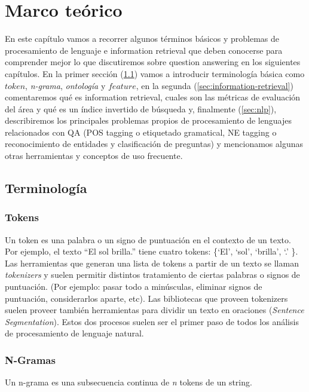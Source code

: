 
\chapter{Marco teórico}
\label{chap:teorico}

En este capítulo vamos a recorrer algunos términos básicos y problemas de procesamiento de lenguaje e information retrieval que deben conocerse para comprender mejor lo que discutiremos sobre question answering en los siguientes capítulos. En la primer sección (\ref{sec:terminologia}) vamos a introducir terminología básica como $token$, \textit{n-grama}, \textit{ontología} y $feature$, en la segunda (\ref{sec:information-retrieval}) comentaremos qué es information retrieval, cuales son las métricas de evaluación del área y qué es un índice invertido de búsqueda y, finalmente (\ref{sec:nlp}), describiremos los principales problemas propios de procesamiento de lenguajes relacionados con QA (POS tagging o etiquetado gramatical, NE tagging o reconocimiento de entidades y clasificación de preguntas) y mencionamos algunas otras herramientas y conceptos de uso frecuente.

\section{Terminología}
\label{sec:terminologia}
\subsection*{Tokens}
Un token es una palabra o un signo de puntuación en el contexto de un texto.
Por ejemplo, el texto {\textquotedblleft}El sol
brilla.{\textquotedblright} tiene cuatro tokens:
\{{\textquoteleft}El{\textquoteright}, {\textquoteleft}sol{\textquoteright}, {\textquoteleft}brilla{\textquoteright}, {\textquoteleft}.{\textquoteright} \}.
Las herramientas que generan una lista de tokens a partir de un texto se llaman
\textit{tokenizers} y suelen permitir distintos tratamiento de ciertas
palabras o signos de puntuación. (Por ejemplo: pasar todo a minúsculas, eliminar signos de puntuación, considerarlos aparte, etc).
Las bibliotecas que proveen tokenizers suelen proveer también herramientas para dividir un texto en
oraciones (\textit{Sentence Segmentation}).
Estos dos procesos suelen ser el primer paso de todos los análisis de procesamiento de lenguaje natural.


\subsection*{N-Gramas}
Un n-grama es una subsecuencia continua de \textit{n} tokens de un string.

